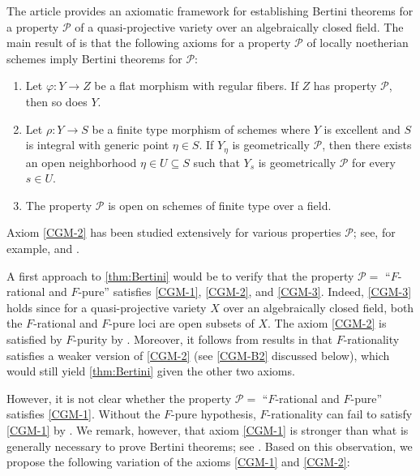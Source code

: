 \documentclass[reqno,11pt]{amsart}
\numberwithin{equation}{section}
\theoremstyle{definition}
\theoremstyle{definition}
\theoremstyle{definition}
\theoremstyle{remark}
\newcommand{\cP}{\mathcal{P}}
\begin{document}
The article \cite{CGM86} provides an axiomatic framework for establishing Bertini theorems for a property $\cP$ of a quasi-projective variety over an algebraically closed field. The main result of \cite{CGM86} is that the following axioms for a property $\cP$ of locally noetherian schemes imply Bertini theorems for $\cP$:
\begin{enumerate}[label=(A\arabic*)]
    \item Let $\varphi\colon Y \to Z$ be a flat morphism with regular fibers. If $Z$ has property $\cP$, then so does $Y$. \label{CGM-1}
    \item Let $\rho\colon Y \to S$ be a finite type morphism of schemes where $Y$ is excellent and $S$ is integral with generic point $\eta \in S$. If $Y_\eta$ is geometrically $\cP$, then there exists an open neighborhood $\eta \in U \subseteq S$ such that $Y_s$ is geometrically $\cP$ for every $s \in U$. \label{CGM-2}
    \item The property $\cP$ is open on schemes of finite type over a field. \label{CGM-3}
\end{enumerate}

Axiom \ref{CGM-2} has been studied extensively for various properties $\cP$; see, for example, \cite[Appendix~E.1]{GW20} and \cite[\S9]{EGA}. 

A first approach to \cref{thm:Bertini} would be to verify that the property $\cP =$ ``$F$-rational and $F$-pure'' satisfies \ref{CGM-1}, \ref{CGM-2}, and \ref{CGM-3}. Indeed, \ref{CGM-3} holds since for a quasi-projective variety $X$ over an algebraically closed field, both the $F$-rational and $F$-pure loci are open subsets of $X$. The axiom \ref{CGM-2} is satisfied by $F$-purity by \cite[Corollary~5.2]{SZ13}. Moreover, it follows from results in \cite{PSZ18} that $F$-rationality satisfies a weaker version of \ref{CGM-2} (see \ref{CGM-B2} discussed below), which would still yield \cref{thm:Bertini} given the other two axioms. 

However, it is not clear whether the property $\cP=$ ``$F$-rational and $F$-pure'' satisfies \ref{CGM-1}. Without the $F$-pure hypothesis, $F$-rationality can fail to satisfy \ref{CGM-1} by \cite{QGSS24}. We remark, however, that axiom \ref{CGM-1} is stronger than what is generally necessary to prove Bertini theorems; see \cite[Remark (i)]{CGM86}. Based on this observation, we propose the following variation of the axioms \ref{CGM-1} and \ref{CGM-2}:
\end{document}
